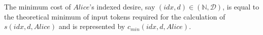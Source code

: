 \begin{definition}
  The minimum cost of $Alice$'s indexed desire, say $\left(idx, d\right) \in
  \left(\mathbb{N}, \mathcal{D}\right)$, is equal to the theoretical minimum of input
  tokens required for the calculation of $s\left(idx, d, Alice\right)$ and is represented
  by $c_{min}\left(idx, d, Alice\right)$.
\end{definition}
